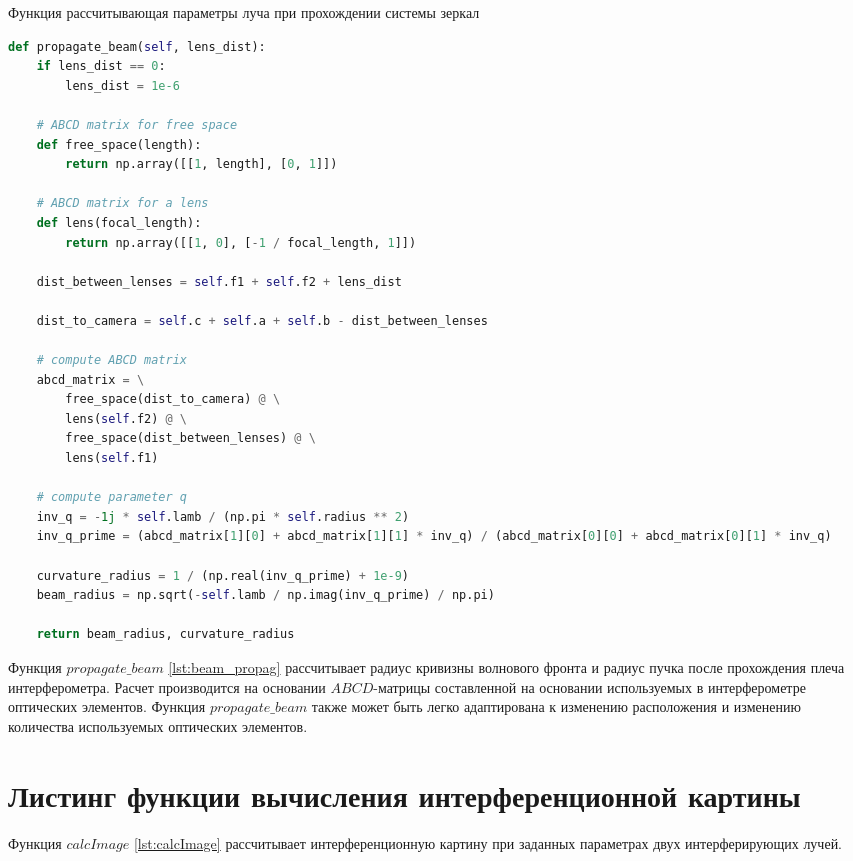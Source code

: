 \begin{ListingEnv}[!h]
\captiondelim{ }
\caption{Функция рассчитывающая параметры луча при прохождении системы зеркал}\label{lst:beam_propag}

\begin{lstlisting}[language=Python]
def propagate_beam(self, lens_dist):
    if lens_dist == 0:
        lens_dist = 1e-6

    # ABCD matrix for free space
    def free_space(length):
        return np.array([[1, length], [0, 1]])

    # ABCD matrix for a lens
    def lens(focal_length):
        return np.array([[1, 0], [-1 / focal_length, 1]])

    dist_between_lenses = self.f1 + self.f2 + lens_dist

    dist_to_camera = self.c + self.a + self.b - dist_between_lenses
    
    # compute ABCD matrix 
    abcd_matrix = \
        free_space(dist_to_camera) @ \
        lens(self.f2) @ \
        free_space(dist_between_lenses) @ \
        lens(self.f1)
    
    # compute parameter q
    inv_q = -1j * self.lamb / (np.pi * self.radius ** 2)
    inv_q_prime = (abcd_matrix[1][0] + abcd_matrix[1][1] * inv_q) / (abcd_matrix[0][0] + abcd_matrix[0][1] * inv_q)

    curvature_radius = 1 / (np.real(inv_q_prime) + 1e-9)
    beam_radius = np.sqrt(-self.lamb / np.imag(inv_q_prime) / np.pi)
    
    return beam_radius, curvature_radius
\end{lstlisting}
\end{ListingEnv}

Функция $propagate\_beam$ \ref{lst:beam_propag} рассчитывает радиус кривизны волнового фронта и радиус пучка после прохождения плеча интерферометра. Расчет производится на основании $ABCD$-матрицы составленной на основании используемых в интерферометре оптических элементов. Функция $propagate\_beam$ также может быть легко адаптирована к изменению расположения и изменению количества используемых оптических элементов. 

\FloatBarrier


\section{Листинг функции вычисления интерференционной картины}\label{app:A3}

Функция $calcImage$ \ref{lst:calcImage} рассчитывает интерференционную картину при заданных параметрах двух интерферирующих лучей. 

